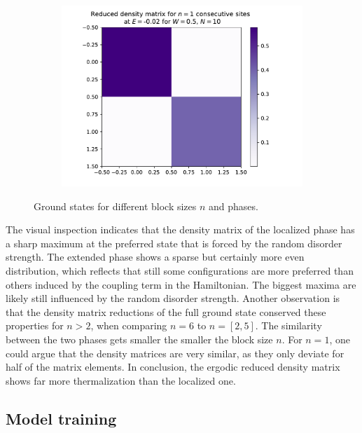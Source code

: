 \documentclass[reprint,amsmath,amssymb,aps,prb]{revtex4-2}
\begin{document}
\begin{center}
\begin{figure}[h!]
\begin{subfigure}[c]{0.45\textwidth}
		\end{subfigure}
		\begin{subfigure}[c]{0.45\textwidth}
			\includegraphics[width=\linewidth]{../results/groundstates/N10n1_trainingset_groundstate_Wmax0.5}
		\end{subfigure}
		\caption{Ground states for different block sizes $n$ and phases.}
		\label{fig:groundstates_erg}
	\end{figure}
\end{center}

The visual inspection indicates that the density matrix of the localized phase has a sharp maximum at the preferred state that is forced by the random disorder strength. The extended phase shows a sparse but certainly more even distribution, which reflects that still some configurations are more preferred than others induced by the coupling term in the Hamiltonian. The biggest maxima are likely still influenced by the random disorder strength. Another observation is that the density matrix reductions of the full ground state conserved these properties for $n>2$, when comparing $n=6$ to $n=\left[2,5\right]$. The similarity between the two phases gets smaller the smaller the block size $n$. For $n=1$, one could argue that the density matrices are very similar, as they only deviate for half of the matrix elements. In conclusion, the ergodic reduced density matrix shows far more thermalization than the localized one.

\subsection{Model training}\label{sec:loss_acc}
\end{document}
